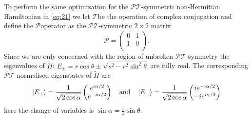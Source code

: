 \documentclass[12pt, a4paper]{report}
\newcommand\PT{\(\mathcal{PT}\)}
\newcommand\PP{\(\mathcal{P}\)}
\newcommand\TT{\(\mathcal{T}\)}
\begin{document}
To perform the same optimization for the \PT-symmetric non-Hermitian Hamiltonian in \ref{eq:21} we let \TT\:be the
operation of complex conjugation and define the \PP\:operator as the \PT-symmetric $2\times2$ matrix
\begin{equation}\label{eq:24}
\mathcal{P} =\begin{pmatrix}
0 & 1 \\
1 & 0\\                
\end{pmatrix}.
\end{equation}
Since we are only concerned with the region of unbroken \PT-symmetry the eigenvalues of $\tilde{H}$: $E_{\pm} = r\cos\theta \pm \sqrt{s^2 - r^2\sin^2\theta}$ are fully real. The corresponding \PT\: normalised eigenstates of $\tilde{H}$ are
\begin{equation}\label{eq:25}
\ket{E_{+}} = \frac{1}{\sqrt{2\cos\alpha}}\begin{pmatrix}
e^{i \alpha/2}\\
e^{-i \alpha/2}\\                
\end{pmatrix}\quad\mathrm{and}\quad \ket{E_{-}} = \frac{1}{\sqrt{2\cos\alpha}}
\begin{pmatrix}
ie^{-i \alpha/2}\\
-ie^{i \alpha/2}\\                
\end{pmatrix}
\end{equation}
here the change of variables is $\sin\alpha = \frac{r}{s}\sin\theta$.
\end{document}
